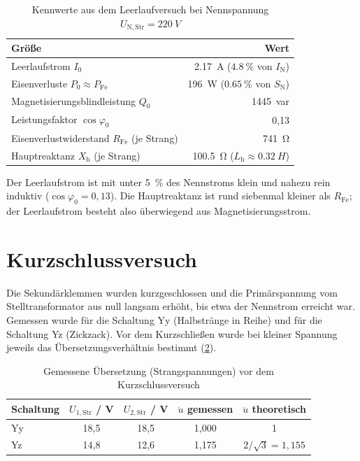 \documentclass[a4paper,11pt]{scrreprt}
\newcommand{\ue}{\ddot{u}}
\begin{document}
\begin{table}[H]
\centering
\caption{Kennwerte aus dem Leerlaufversuch bei Nennspannung $U_\mathrm{N,Str} = \SI{220}{V}$}
\label{tab:ll}
\begin{tabular}{@{}lr@{}}
\toprule
Größe & Wert\\
\midrule
Leerlaufstrom $I_0$ & \SI{2.17}{A} ($\SI{4.8}{\percent}$ von $I_\mathrm{N}$)\\
Eisenverluste $P_0 \approx P_\mathrm{Fe}$ & \SI{196}{W} ($\SI{0.65}{\percent}$ von $S_\mathrm{N}$)\\
Magnetisierungsblindleistung $Q_0$ & \SI{1445}{var}\\
Leistungsfaktor $\cos\varphi_0$ & 0,13\\
Eisenverlustwiderstand $R_\mathrm{Fe}$ (je Strang) & \SI{741}{\ohm}\\
Hauptreaktanz $X_\mathrm{h}$ (je Strang) & \SI{100.5}{\ohm} ($L_\mathrm{h}\approx\SI{0.32}{H}$)\\
\bottomrule
\end{tabular}
\end{table}

Der Leerlaufstrom ist mit unter \SI{5}{\percent} des Nennstroms klein und nahezu rein induktiv ($\cos\varphi_0 = 0{,}13$). Die Hauptreaktanz ist rund siebenmal kleiner als $R_\mathrm{Fe}$; der Leerlaufstrom besteht also überwiegend aus Magnetisierungsstrom.

\section{Kurzschlussversuch}

Die Sekundärklemmen wurden kurzgeschlossen und die Primärspannung vom Stelltransformator aus null langsam erhöht, bis etwa der Nennstrom erreicht war. Gemessen wurde für die Schaltung Yy (Halbstränge in Reihe) und für die Schaltung Yz (Zickzack). Vor dem Kurzschließen wurde bei kleiner Spannung jeweils das Übersetzungsverhältnis bestimmt (\cref{tab:ue}).

\begin{table}[H]
\centering
\caption{Gemessene Übersetzung (Strangspannungen) vor dem Kurzschlussversuch}
\label{tab:ue}
\begin{tabular}{@{}lcccc@{}}
\toprule
Schaltung & $U_{1,\mathrm{Str}}$ / V & $U_{2,\mathrm{Str}}$ / V & $\ue$ gemessen & $\ue$ theoretisch\\
\midrule
Yy & 18,5 & 18,5 & 1,000 & 1\\
Yz & 14,8 & 12,6 & 1,175 & $2/\sqrt3 = 1{,}155$\\
\bottomrule
\end{tabular}
\end{table}
\end{document}
